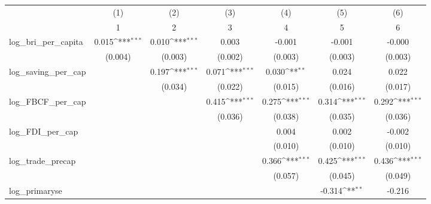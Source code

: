 {
\def\sym#1{\ifmmode^{#1}\else\(^{#1}\)\fi}
\begin{tabular}{l*{6}{c}}
\toprule
            &\multicolumn{1}{c}{(1)}&\multicolumn{1}{c}{(2)}&\multicolumn{1}{c}{(3)}&\multicolumn{1}{c}{(4)}&\multicolumn{1}{c}{(5)}&\multicolumn{1}{c}{(6)}\\
            &\multicolumn{1}{c}{1}&\multicolumn{1}{c}{2}&\multicolumn{1}{c}{3}&\multicolumn{1}{c}{4}&\multicolumn{1}{c}{5}&\multicolumn{1}{c}{6}\\
\midrule
log\_bri\_per\_capita&       0.015\sym{***}&       0.010\sym{***}&       0.003         &      -0.001         &      -0.001         &      -0.000         \\
            &     (0.004)         &     (0.003)         &     (0.002)         &     (0.003)         &     (0.003)         &     (0.003)         \\
\addlinespace
log\_saving\_per\_cap&                     &       0.197\sym{***}&       0.071\sym{***}&       0.030\sym{**} &       0.024         &       0.022         \\
            &                     &     (0.034)         &     (0.022)         &     (0.015)         &     (0.016)         &     (0.017)         \\
\addlinespace
log\_FBCF\_per\_cap&                     &                     &       0.415\sym{***}&       0.275\sym{***}&       0.314\sym{***}&       0.292\sym{***}\\
            &                     &                     &     (0.036)         &     (0.038)         &     (0.035)         &     (0.036)         \\
\addlinespace
log\_FDI\_per\_cap&                     &                     &                     &       0.004         &       0.002         &      -0.002         \\
            &                     &                     &                     &     (0.010)         &     (0.010)         &     (0.010)         \\
\addlinespace
log\_trade\_precap&                     &                     &                     &       0.366\sym{***}&       0.425\sym{***}&       0.436\sym{***}\\
            &                     &                     &                     &     (0.057)         &     (0.045)         &     (0.049)         \\
\addlinespace
log\_primaryse&                     &                     &                     &                     &      -0.314\sym{**} &      -0.216         \\

\end{tabular}}
